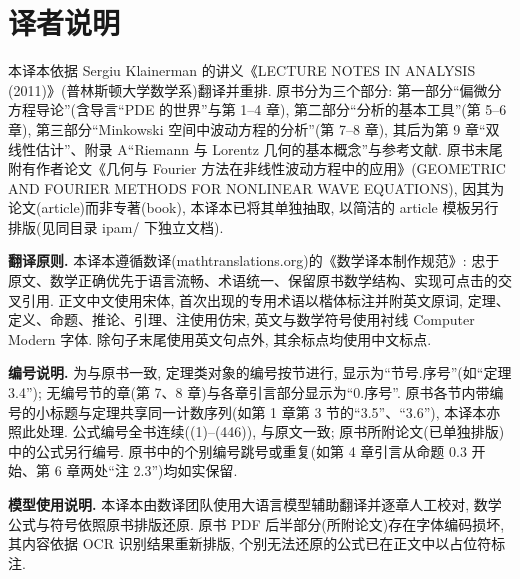 \documentclass[
  BookTitleCN={分析讲义},
  BookTitleEN={LECTURE NOTES IN ANALYSIS (2011)},
  OriginalAuthor={Sergiu Klainerman},
  OriginalEdition={2011 年讲义(普林斯顿大学)},
  OriginalPublisher={Princeton University},
  OriginalYear={2011},
  Translator={Fingolfin},
  ModelUsed={DeepSeek-V4-Flash+混元3},
  TranslationDate={28 Aug 2026}
]{mathtranslation}
\begin{document}
\makecover

\frontmatter
{}
\setcounter{page}{1}
\pagestyle{plain}

\chapter*{译者说明}

本译本依据 Sergiu Klainerman 的讲义《LECTURE NOTES IN ANALYSIS (2011)》(普林斯顿大学数学系)翻译并重排. 原书分为三个部分: 第一部分``偏微分方程导论''(含导言``PDE 的世界''与第 1--4 章), 第二部分``分析的基本工具''(第 5--6 章), 第三部分``Minkowski 空间中波动方程的分析''(第 7--8 章), 其后为第 9 章``双线性估计''、附录 A``Riemann 与 Lorentz 几何的基本概念''与参考文献. 原书末尾附有作者论文《几何与 Fourier 方法在非线性波动方程中的应用》(GEOMETRIC AND FOURIER METHODS FOR NONLINEAR WAVE EQUATIONS), 因其为论文(article)而非专著(book), 本译本已将其单独抽取, 以简洁的 article 模板另行排版(见同目录 ipam/ 下独立文档).

\textbf{翻译原则.} 本译本遵循数译(mathtranslations.org)的《数学译本制作规范》: 忠于原文、数学正确优先于语言流畅、术语统一、保留原书数学结构、实现可点击的交叉引用. 正文中文使用宋体, 首次出现的专用术语以楷体标注并附英文原词, 定理、定义、命题、推论、引理、注使用仿宋, 英文与数学符号使用衬线 Computer Modern 字体. 除句子末尾使用英文句点外, 其余标点均使用中文标点.

\textbf{编号说明.} 为与原书一致, 定理类对象的编号按节进行, 显示为``节号.序号''(如``定理 3.4''); 无编号节的章(第 7、8 章)与各章引言部分显示为``0.序号''. 原书各节内带编号的小标题与定理共享同一计数序列(如第 1 章第 3 节的``3.5''、``3.6''), 本译本亦照此处理. 公式编号全书连续((1)--(446)), 与原文一致; 原书所附论文(已单独排版)中的公式另行编号. 原书中的个别编号跳号或重复(如第 4 章引言从命题 0.3 开始、第 6 章两处``注 2.3'')均如实保留.

\textbf{模型使用说明.} 本译本由数译团队使用大语言模型辅助翻译并逐章人工校对, 数学公式与符号依照原书排版还原. 原书 PDF 后半部分(所附论文)存在字体编码损坏, 其内容依据 OCR 识别结果重新排版, 个别无法还原的公式已在正文中以占位符标注.

\vspace{0.5cm}
\hfill \Translator
\end{document}
